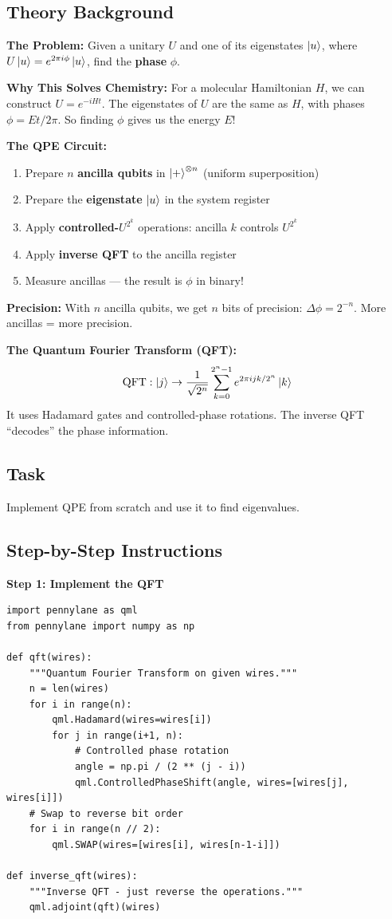 \documentclass[11pt,a4paper]{article}
\begin{document}
\subsection*{Theory Background}
\textbf{The Problem:} Given a unitary $U$ and one of its eigenstates $\ket{u}$, where $U\ket{u} = e^{2\pi i \phi}\ket{u}$, find the \textbf{phase} $\phi$.

\textbf{Why This Solves Chemistry:} For a molecular Hamiltonian $H$, we can construct $U = e^{-iHt}$. The eigenstates of $U$ are the same as $H$, with phases $\phi = Et/2\pi$. So finding $\phi$ gives us the energy $E$!

\textbf{The QPE Circuit:}
\begin{enumerate}
    \item Prepare $n$ \textbf{ancilla qubits} in $\ket{+}^{\otimes n}$ (uniform superposition)
    \item Prepare the \textbf{eigenstate} $\ket{u}$ in the system register
    \item Apply \textbf{controlled-$U^{2^k}$} operations: ancilla $k$ controls $U^{2^k}$
    \item Apply \textbf{inverse QFT} to the ancilla register
    \item Measure ancillas --- the result is $\phi$ in binary!
\end{enumerate}

\textbf{Precision:} With $n$ ancilla qubits, we get $n$ bits of precision: $\Delta\phi = 2^{-n}$. More ancillas = more precision.

\textbf{The Quantum Fourier Transform (QFT):}
\[
\text{QFT}: \ket{j} \to \frac{1}{\sqrt{2^n}} \sum_{k=0}^{2^n-1} e^{2\pi i jk / 2^n} \ket{k}
\]
It uses Hadamard gates and controlled-phase rotations. The inverse QFT ``decodes'' the phase information.

\subsection*{Task}
Implement QPE from scratch and use it to find eigenvalues.

\subsection*{Step-by-Step Instructions}

\textbf{Step 1: Implement the QFT}
\begin{lstlisting}
import pennylane as qml
from pennylane import numpy as np

def qft(wires):
    """Quantum Fourier Transform on given wires."""
    n = len(wires)
    for i in range(n):
        qml.Hadamard(wires=wires[i])
        for j in range(i+1, n):
            # Controlled phase rotation
            angle = np.pi / (2 ** (j - i))
            qml.ControlledPhaseShift(angle, wires=[wires[j], wires[i]])
    # Swap to reverse bit order
    for i in range(n // 2):
        qml.SWAP(wires=[wires[i], wires[n-1-i]])

def inverse_qft(wires):
    """Inverse QFT - just reverse the operations."""
    qml.adjoint(qft)(wires)
\end{lstlisting}
\end{document}
